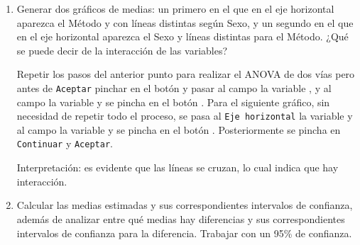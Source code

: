 \begin{enumerate}
\begin{enumerate}
\begin{indicacion}{Utilizar el menú \texttt{Analizar\flecha Modelo lineal general\flecha Univariante} y utilizar como \texttt{Variable dependiente} la variable  y como \texttt{Factores fijos} las variables \textsf{Sexo} y \textsf{Método}. Por último pinchar en el botón .

Interpretación: no hay diferencias significativas asociadas al sexo ni al método. Sin embargo sí que hay interacción, es decir la diferencia en el tiempo de respuesta entre hombres y mujeres depende del método seguido, e igualmente las diferencias entre los tiempos de respuesta según los diferentes métodos dependen del sexo.

}
\end{indicacion}


\item Generar dos gráficos de medias: un primero en el que en el eje horizontal aparezca el Método y con líneas distintas según Sexo, y un segundo en el que en el eje horizontal aparezca el Sexo y líneas distintas para el Método. ¿Qué se puede decir de la interacción de las variables?

\begin{indicacion}{Repetir los pasos del anterior punto para realizar el ANOVA de dos vías pero antes de \texttt{Aceptar} pinchar en el botón  y pasar al campo  la variable , y al campo  la variable  y se pincha en el botón . Para el siguiente gráfico, sin necesidad de repetir todo el proceso, se pasa al \texttt{Eje horizontal} la variable  y al campo  la variable  y se pincha en el botón . Posteriormente se pincha en \texttt{Continuar} y \texttt{Aceptar}.

Interpretación: es evidente que las líneas se cruzan, lo cual indica que hay interacción.

}
\end{indicacion}

\item Calcular las medias estimadas y sus correspondientes intervalos de confianza, además de analizar entre qué medias hay diferencias y sus correspondientes intervalos de confianza para la diferencia. Trabajar con un 95\% de confianza.


\end{enumerate}
\end{enumerate}
